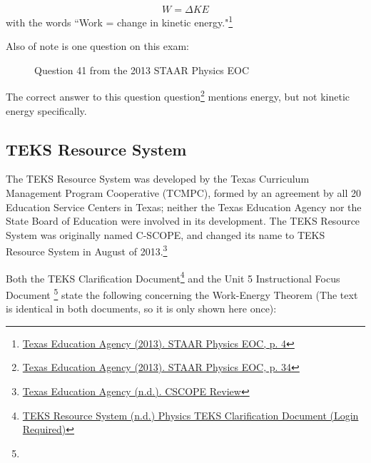 \documentclass[letterpaper, 12pt]{article}
\begin{document}
\begin{equation}
	W = \Delta KE
\end{equation}
with the words ``Work = change in kinetic energy."\footnote{\color{blue}\href{https://tea.texas.gov/sites/default/files/STAAR-EOC-TestPhysics.pdf}{Texas Education Agency (2013).  STAAR Physics EOC, p. 4}\color{black}}


Also of note is one question on this exam:
\begin{figure}[H]
	\caption{Question 41 from the 2013 STAAR Physics EOC} 
\end{figure}

The correct answer to this question question\footnote{\color{blue}\href{https://tea.texas.gov/sites/default/files/STAAR-EOC-TestPhysics.pdf}{Texas Education Agency (2013).  STAAR Physics EOC, p. 34}\color{black}} mentions energy, but not kinetic energy specifically.  


\subsection{TEKS Resource System}
The TEKS Resource System was developed by the Texas Curriculum Management Program Cooperative (TCMPC), formed by an agreement by all 20 Education Service Centers in Texas; neither the Texas Education Agency nor the State Board of Education were involved in its development. The TEKS Resource System was originally named C-SCOPE, and changed its name to TEKS Resource System in August of 2013.\footnote{\color{blue}  \href{https://tea.texas.gov/about-tea/leadership/cscope-review}{Texas Education Agency (n.d.). CSCOPE Review} \color{black} }

Both the TEKS Clarification Document\footnote{\color{blue} \href{https://www.teksresourcesystem.net/module/content/search/~/item/694111/viewdetail.ashx}{TEKS Resource System (n.d.) Physics TEKS Clarification Document (Login Required)} \color{black}} and the Unit 5 Instructional Focus Document \footnote{\color{blue}} state the following concerning the Work-Energy Theorem (The text is identical in both documents, so it is only shown here once):
\end{document}
